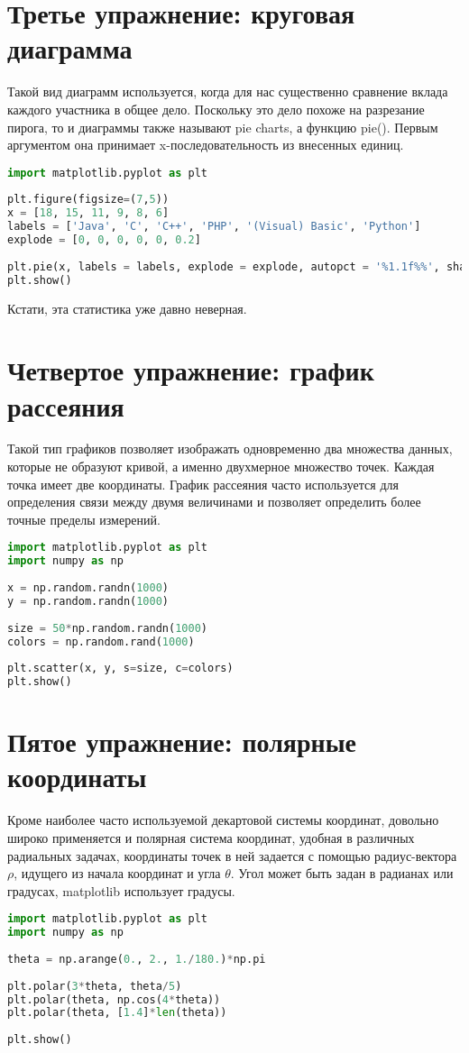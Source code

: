 \documentclass[a4paper,12pt]{article}
\begin{document}
\section{Третье упражнение: круговая диаграмма}
Такой вид диаграмм используется, когда для нас существенно сравнение вклада каждого участника в общее дело. Поскольку это дело похоже на разрезание пирога, то и диаграммы также называют pie charts, а функцию pie(). Первым аргументом она принимает x-последовательность из внесенных единиц.
\begin{lstlisting}[language=python]
import matplotlib.pyplot as plt
 
plt.figure(figsize=(7,5))
x = [18, 15, 11, 9, 8, 6]
labels = ['Java', 'C', 'C++', 'PHP', '(Visual) Basic', 'Python']
explode = [0, 0, 0, 0, 0, 0.2]
 
plt.pie(x, labels = labels, explode = explode, autopct = '%1.1f%%', shadow=True);
plt.show()
\end{lstlisting}
Кстати, эта статистика уже давно неверная. 

\section{Четвертое упражнение: график рассеяния}
Такой тип графиков позволяет изображать одновременно два множества данных, которые не образуют кривой, а именно двухмерное множество точек. Каждая точка имеет две координаты. График рассеяния часто используется для определения связи между двумя величинами и позволяет определить более точные пределы измерений.
\begin{lstlisting}[language=python]
import matplotlib.pyplot as plt
import numpy as np
 
x = np.random.randn(1000)
y = np.random.randn(1000)
 
size = 50*np.random.randn(1000)
colors = np.random.rand(1000)
 
plt.scatter(x, y, s=size, c=colors)
plt.show()
\end{lstlisting}

\section{Пятое упражнение: полярные координаты}
Кроме наиболее часто используемой декартовой системы координат, довольно широко применяется и полярная система координат, удобная в различных радиальных задачах, координаты точек в ней задается с помощью радиус-вектора $\rho$, идущего из начала координат и угла $\theta$. Угол может быть задан в радианах или градусах, matplotlib использует градусы.
\begin{lstlisting}[language=python]
import matplotlib.pyplot as plt
import numpy as np
 
theta = np.arange(0., 2., 1./180.)*np.pi    
 
plt.polar(3*theta, theta/5)        
plt.polar(theta, np.cos(4*theta))  
plt.polar(theta, [1.4]*len(theta))  
 
plt.show()
\end{lstlisting}
\end{document}
